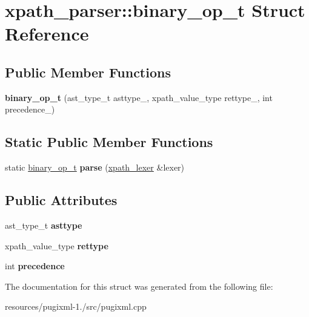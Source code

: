 \hypertarget{structxpath__parser_1_1binary__op__t}{\section{xpath\+\_\+parser\+:\+:binary\+\_\+op\+\_\+t Struct Reference}
\label{structxpath__parser_1_1binary__op__t}
}
\subsection*{Public Member Functions}
\begin{DoxyCompactItemize}
\item 
\hypertarget{structxpath__parser_1_1binary__op__t_a6b8a545436af8aa0c74c91e181a2b865}{{\bfseries binary\+\_\+op\+\_\+t} (ast\+\_\+type\+\_\+t asttype\+\_\+, xpath\+\_\+value\+\_\+type rettype\+\_\+, int precedence\+\_\+)}\label{structxpath__parser_1_1binary__op__t_a6b8a545436af8aa0c74c91e181a2b865}

\end{DoxyCompactItemize}
\subsection*{Static Public Member Functions}
\begin{DoxyCompactItemize}
\item 
\hypertarget{structxpath__parser_1_1binary__op__t_a723f5f2b66df47b4ac74455cb39b9544}{static \hyperlink{structxpath__parser_1_1binary__op__t}{binary\+\_\+op\+\_\+t} {\bfseries parse} (\hyperlink{classxpath__lexer}{xpath\+\_\+lexer} \&lexer)}\label{structxpath__parser_1_1binary__op__t_a723f5f2b66df47b4ac74455cb39b9544}

\end{DoxyCompactItemize}
\subsection*{Public Attributes}
\begin{DoxyCompactItemize}
\item 
\hypertarget{structxpath__parser_1_1binary__op__t_a1af7e302de46bf45ffdb466cfd89fa15}{ast\+\_\+type\+\_\+t {\bfseries asttype}}\label{structxpath__parser_1_1binary__op__t_a1af7e302de46bf45ffdb466cfd89fa15}

\item 
\hypertarget{structxpath__parser_1_1binary__op__t_a02c18d8d6d9a7ef28b2fefcb900e75bc}{xpath\+\_\+value\+\_\+type {\bfseries rettype}}\label{structxpath__parser_1_1binary__op__t_a02c18d8d6d9a7ef28b2fefcb900e75bc}

\item 
\hypertarget{structxpath__parser_1_1binary__op__t_a422064e11cc65c6110c422568441b69c}{int {\bfseries precedence}}\label{structxpath__parser_1_1binary__op__t_a422064e11cc65c6110c422568441b69c}

\end{DoxyCompactItemize}


The documentation for this struct was generated from the following file\+:\begin{DoxyCompactItemize}
\item 
resources/pugixml-\/1./src/pugixml.\+cpp\end{DoxyCompactItemize}
